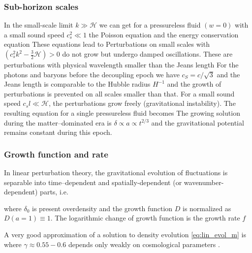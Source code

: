 \subsubsection{Sub-horizon scales}
In the small-scale limit $k\gg\mathcal{H}$ we can get for a pressureless fluid $(w=0)$ with a small sound speed $c_s^2\ll1$ the Poisson equation
and the energy conservation equation
These equations lead to
Perturbations on small scales with $(c_s^2k^2-\frac32\mathcal{H})>0$ do not grow but undergo damped oscillations. These are perturbations with physical wavelength smaller than the Jeans length
For the photons and baryons before the decoupling epoch we have $c_S=c/\sqrt3$ and the Jeans length is comparable to the Hubble radius $H^{-1}$ and the growth of perturbations is prevented on all scales smaller than that. For a small sound speed $c_sl\ll\mathcal{H}$, the perturbations grow freely (gravitational instability). The resulting equation for a single pressureless fluid becomes
The growing solution during the matter--dominated era is $\delta\propto a\propto t^{2/3}$ and the gravitational potential remains constant during this epoch.

\subsubsection{Growth function and rate}
In linear perturbation theory, the gravitational evolution of fluctuations is separable into time--dependent and spatially-dependent (or wavenumber-dependent) parts, i.e.
\begin{sloppypar}
where $\delta_0$ is present overdensity and the growth function $D$ is normalized as ${D(a=1)\equiv1}$. The logarithmic change of growth function is the growth rate $f$
\end{sloppypar}
 A very good approximation of a solution to density evolution \eqref{eq:lin_evol_m} is
where $\gamma\approx0.55-0.6$ depends only weakly on cosmological parameters \parencite{1980_Peebles}.

